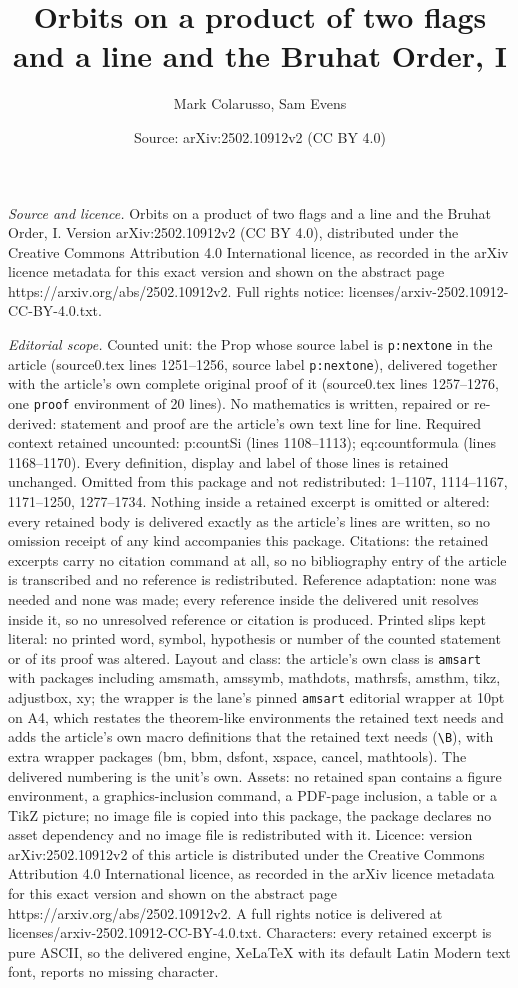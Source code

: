 \documentclass[10pt,a4paper]{amsart}
\title[Orbits on a product of two flags and a line and the Bruhat O]{Orbits on a product of two flags and a line and the Bruhat Order, I}
\author{Mark Colarusso, Sam Evens}
\date{Source: arXiv:2502.10912v2 (CC BY 4.0)}
\begin{document}
\maketitle

\noindent\emph{Source and licence.} Orbits on a product of two flags and a line and the Bruhat Order, I. Version arXiv:2502.10912v2 (CC BY 4.0), distributed under the Creative Commons Attribution 4.0 International licence, as recorded in the arXiv licence metadata for this exact version and shown on the abstract page https://arxiv.org/abs/2502.10912v2. Full rights notice: licenses/arxiv-2502.10912-CC-BY-4.0.txt.\par\smallskip

\noindent\textit{Editorial scope.} Counted unit: the Prop whose source label is \texttt{p:nextone} in the article (source0.tex lines 1251--1256, source label \texttt{p:nextone}), delivered together with the article's own complete original proof of it (source0.tex lines 1257--1276, one \texttt{proof} environment of 20 lines). No mathematics is written, repaired or re-derived: statement and proof are the article's own text line for line. Required context retained uncounted: p:countSi (lines 1108--1113); eq:countformula (lines 1168--1170). Every definition, display and label of those lines is retained unchanged. Omitted from this package and not redistributed: 1--1107, 1114--1167, 1171--1250, 1277--1734. Nothing inside a retained excerpt is omitted or altered: every retained body is delivered exactly as the article's lines are written, so no omission receipt of any kind accompanies this package. Citations: the retained excerpts carry no citation command at all, so no bibliography entry of the article is transcribed and no reference is redistributed. Reference adaptation: none was needed and none was made; every reference inside the delivered unit resolves inside it, so no unresolved reference or citation is produced. Printed slips kept literal: no printed word, symbol, hypothesis or number of the counted statement or of its proof was altered. Layout and class: the article's own class is \texttt{amsart} with packages including amsmath, amssymb, mathdots, mathrsfs, amsthm, tikz, adjustbox, xy; the wrapper is the lane's pinned \texttt{amsart} editorial wrapper at 10pt on A4, which restates the theorem-like environments the retained text needs and adds the article's own macro definitions that the retained text needs (\texttt{\textbackslash B}), with extra wrapper packages (bm, bbm, dsfont, xspace, cancel, mathtools). The delivered numbering is the unit's own. Assets: no retained span contains a figure environment, a graphics-inclusion command, a PDF-page inclusion, a table or a TikZ picture; no image file is copied into this package, the package declares no asset dependency and no image file is redistributed with it. Licence: version arXiv:2502.10912v2 of this article is distributed under the Creative Commons Attribution 4.0 International licence, as recorded in the arXiv licence metadata for this exact version and shown on the abstract page https://arxiv.org/abs/2502.10912v2. A full rights notice is delivered at licenses/arxiv-2502.10912-CC-BY-4.0.txt. Characters: every retained excerpt is pure ASCII, so the delivered engine, XeLaTeX with its default Latin Modern text font, reports no missing character.
\end{document}
